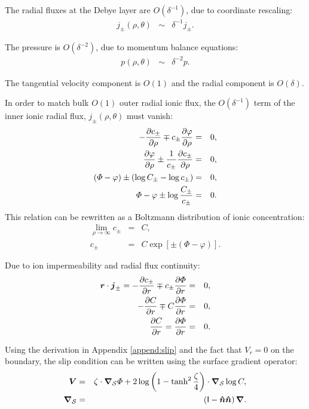 The radial fluxes at the Debye layer are $O(\delta^{-1})$, due to coordinate rescaling:
\begin{eqnarray}
  j_\pm(\rho, \theta) &\sim& \delta^{-1} j_\pm.
\end{eqnarray}

The pressure is $O(\delta^{-2})$, due to momentum balance equations:
\begin{eqnarray}
  p(\rho, \theta) &\sim& \delta^{-2} p.
\end{eqnarray}

The tangential velocity component is $O(1)$ and the radial component is $O(\delta)$.

In order to match bulk $O(1)$ outer radial ionic flux, 
the $O(\delta^{-1})$ term of the inner ionic radial flux, $j_\pm(\rho, \theta)$ must vanish:
\begin{eqnarray}
  -\frac{\partial c_\pm}{\partial \rho} \mp c_\pm \frac{\partial \varphi}{\partial \rho} &=& 0, \\
  \frac{\partial \varphi}{\partial \rho} \pm\frac{1}{c_\pm}\frac{\partial c_\pm}{\partial \rho} &=& 0, \\
  \left(\varPhi - \varphi\right) \pm\left(\log C_\pm - \log c_\pm\right) &=& 0, \\
  \varPhi - \varphi \pm \log \frac{C_\pm}{c_\pm} &=& 0.
\end{eqnarray}
This relation can be rewritten as a Boltzmann distribution of ionic concentration:
\begin{eqnarray}
\lim_{\rho\rightarrow\infty} c_\pm &=& C, \\
c_\pm &=& C \exp\left[\pm(\varPhi - \varphi)\right].
\end{eqnarray}

Due to ion impermeability and radial flux continuity:
\begin{eqnarray}
  \boldsymbol{r} \cdot \boldsymbol{j}_\pm = -\frac{\partial c_\pm}{\partial r} \mp c_\pm \frac{\partial \varPhi}{\partial r} &=& 0, \\
-\frac{\partial C}{\partial r} \mp C \frac{\partial \varPhi}{\partial r} &=& 0, \\
\frac{\partial C}{\partial r} = \frac{\partial \varPhi}{\partial r} &=& 0.
\end{eqnarray}

Using the derivation in Appendix \ref{append:slip} and the fact that $V_r = 0$ 
on the boundary, the slip condition can be written using the surface
gradient operator:
\begin{eqnarray}
\boldsymbol{V} &=& 
\zeta \cdot \boldsymbol{\nabla}_\mathcal{S} \varPhi 
+ 2\log\left(1-\tanh^2\frac{\zeta}{4}\right) \cdot \boldsymbol{\nabla}_\mathcal{S} \log C, \\
\boldsymbol{\nabla}_\mathcal{S} &=& \left(\mathsf{I} - \boldsymbol{\hat{n}}\boldsymbol{\hat{n}}\right) \boldsymbol{\nabla}.
\end{eqnarray}

